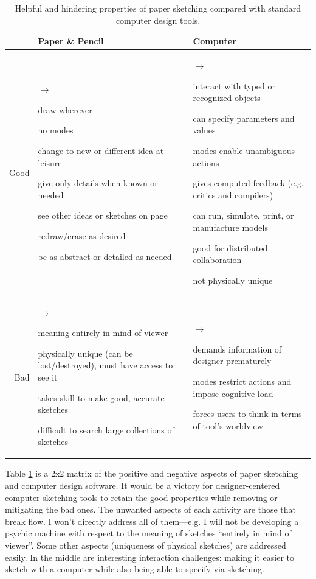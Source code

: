 \documentclass[12pt]{article}
\newcommand{\squishlist}{
 \begin{list}{$\rightarrow$} %
  { \setlength{\itemsep}{0pt}
     \setlength{\parsep}{3pt}
     \setlength{\topsep}{3pt}
     \setlength{\partopsep}{0pt}
     \setlength{\leftmargin}{1.5em}
     \setlength{\labelwidth}{1em}
     \setlength{\labelsep}{0.5em} } }
\newcommand{\squishend}{
  \end{list}  }
\begin{document}
\begin{table}[t] %
\centering
\begin{tabular}{|r|p{7.0cm}|p{7.0cm}|}
\hline
 & Paper \& Pencil & Computer \\
\hline
Good &
\squishlist
\item draw wherever
\item no modes
\item change to new or different idea at leisure
\item give only details when known or needed
\item see other ideas or sketches on page
\item redraw/erase as desired
\item be as abstract or detailed as needed
\squishend
&
\squishlist
\item interact with typed or recognized objects
\item can specify parameters and values
\item modes enable unambiguous actions
\item gives computed feedback (e.g. critics and compilers)
\item can run, simulate, print, or manufacture models
\item good for distributed collaboration
\item not physically unique
\squishend
\\
\hline
Bad &
\squishlist
\item meaning entirely in mind of viewer
\item physically unique (can be lost/destroyed), must have access to see it
\item takes skill to make good, accurate sketches
\item difficult to search large collections of sketches
\squishend
&
\squishlist
\item demands information of designer prematurely
\item modes restrict actions and impose cognitive load
\item forces users to think in terms of tool's worldview
\squishend
\\
\hline
\end{tabular}
\caption{Helpful and hindering properties of paper sketching compared
  with standard computer design tools.}
\label{tab:helpful-hinder}
\end{table}

Table \ref{tab:helpful-hinder} is a 2x2 matrix of the positive and
negative aspects of paper sketching and computer design software. It
would be a victory for designer-centered computer sketching tools to
retain the good properties while removing or mitigating the bad ones.
The unwanted aspects of each activity are those that break flow. I
won't directly address all of them---e.g. I will not be developing a
psychic machine with respect to the meaning of sketches ``entirely in
mind of viewer''. Some other aspects (uniqueness of physical sketches)
are addressed easily. In the middle are interesting interaction
challenges: making it easier to sketch with a computer while also
being able to specify via sketching.
\end{document}
